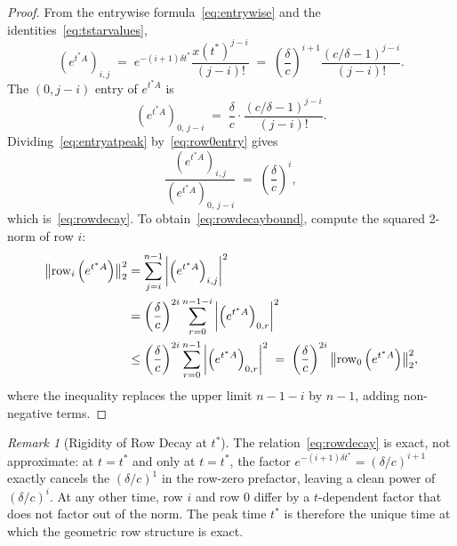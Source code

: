 \documentclass[11pt,reqno]{article}
\theoremstyle{plain}
\theoremstyle{definition}
\theoremstyle{remark}
\newtheorem{remark}[theorem]{Remark}
\numberwithin{equation}{section}
\begin{document}
\begin{proof}
From the entrywise formula~\eqref{eq:entrywise} and the identities~\eqref{eq:tstarvalues},
\begin{equation}\label{eq:entryatpeak}
  \left(e^{t^*A}\right)_{i,j} \;=\; e^{-(i+1)\delta t^*} \frac{x(t^*)^{j-i}}{(j-i)!} \;=\; \left(\frac{\delta}{c}\right)^{i+1} \frac{(c/\delta - 1)^{j-i}}{(j-i)!}.
\end{equation}
The $(0, j-i)$ entry of $e^{t^*A}$ is
\begin{equation}\label{eq:row0entry}
  \left(e^{t^*A}\right)_{0,\,j-i} \;=\; \frac{\delta}{c}\cdot\frac{(c/\delta - 1)^{j-i}}{(j-i)!}.
\end{equation}
Dividing~\eqref{eq:entryatpeak} by~\eqref{eq:row0entry} gives
\[
  \frac{\left(e^{t^*A}\right)_{i,j}}{\left(e^{t^*A}\right)_{0,\,j-i}} \;=\; \left(\frac{\delta}{c}\right)^i,
\]
which is~\eqref{eq:rowdecay}. To obtain~\eqref{eq:rowdecaybound}, compute the squared 2-norm of row $i$:
\begin{align}
  \bigl\|\operatorname{row}_i\left(e^{t^*A}\right)\bigr\|_2^2 &= \sum_{j=i}^{n-1} \left|\left(e^{t^*A}\right)_{i,j}\right|^2 \notag\\
  &= \left(\frac{\delta}{c}\right)^{2i} \sum_{r=0}^{n-1-i} \left|\left(e^{t^*A}\right)_{0,r}\right|^2 \notag\\
  &\le \left(\frac{\delta}{c}\right)^{2i} \sum_{r=0}^{n-1} \left|\left(e^{t^*A}\right)_{0,r}\right|^2 \;=\; \left(\frac{\delta}{c}\right)^{2i} \bigl\|\operatorname{row}_0\left(e^{t^*A}\right)\bigr\|_2^2, \notag
\end{align}
where the inequality replaces the upper limit $n-1-i$ by $n-1$, adding non-negative terms.
\end{proof}

\begin{remark}[Rigidity of Row Decay at $t^*$]\label{rem:rigidity}
The relation~\eqref{eq:rowdecay} is exact, not approximate: at $t = t^*$ and only at $t = t^*$, the factor $e^{-(i+1)\delta t^*} = (\delta/c)^{i+1}$ exactly cancels the $(\delta/c)^1$ in the row-zero prefactor, leaving a clean power of $(\delta/c)^i$. At any other time, row $i$ and row $0$ differ by a $t$-dependent factor that does not factor out of the norm. The peak time $t^*$ is therefore the unique time at which the geometric row structure is exact.
\end{remark}
\end{document}
